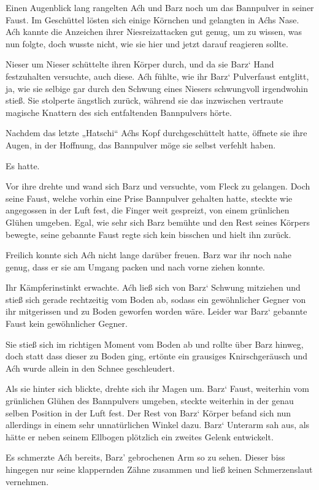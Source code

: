 Einen Augenblick lang rangelten Aćh und Barz noch um das Bannpulver in seiner Faust. Im Geschüttel lösten sich einige Körnchen und gelangten in Aćhs Nase. Aćh kannte die Anzeichen ihrer Niesreizattacken gut genug, um zu wissen, was nun folgte, doch wusste nicht, wie sie hier und jetzt darauf reagieren sollte.

Nieser um Nieser schüttelte ihren Körper durch, und da sie Barz‘ Hand festzuhalten versuchte, auch diese. Aćh fühlte, wie ihr Barz‘ Pulverfaust entglitt, ja, wie sie selbige gar durch den Schwung eines Niesers schwungvoll irgendwohin stieß. Sie stolperte ängstlich zurück, während sie das inzwischen vertraute magische Knattern des sich entfaltenden Bannpulvers hörte.

Nachdem das letzte „Hatschi“ Aćhs Kopf durchgeschüttelt hatte, öffnete sie ihre Augen, in der Hoffnung, das Bannpulver möge sie selbst verfehlt haben.

Es hatte.

Vor ihre drehte und wand sich Barz und versuchte, vom Fleck zu gelangen. Doch seine Faust, welche vorhin eine Prise Bannpulver gehalten hatte, steckte wie angegossen in der Luft fest, die Finger weit gespreizt, von einem grünlichen Glühen umgeben. Egal, wie sehr sich Barz bemühte und den Rest seines Körpers bewegte, seine gebannte Faust regte sich kein bisschen und hielt ihn zurück.

Freilich konnte sich Aćh nicht lange darüber freuen. Barz war ihr noch nahe genug, dass er sie am Umgang packen und nach vorne ziehen konnte.

Ihr Kämpferinstinkt erwachte. Aćh ließ sich von Barz‘ Schwung mitziehen und stieß sich gerade rechtzeitig vom Boden ab, sodass ein gewöhnlicher Gegner von ihr mitgerissen und zu Boden geworfen worden wäre. Leider war Barz‘ gebannte Faust kein gewöhnlicher Gegner.

Sie stieß sich im richtigen Moment vom Boden ab und rollte über Barz hinweg, doch statt dass dieser zu Boden ging, ertönte ein grausiges Knirschgeräusch und Aćh wurde allein in den Schnee geschleudert.

Als sie hinter sich blickte, drehte sich ihr Magen um. Barz‘ Faust, weiterhin vom grünlichen Glühen des Bannpulvers umgeben, steckte weiterhin in der genau selben Position in der Luft fest. Der Rest von Barz‘ Körper befand sich nun allerdings in einem sehr unnatürlichen Winkel dazu. Barz‘ Unterarm sah aus, als hätte er neben seinem Ellbogen plötzlich ein zweites Gelenk entwickelt.

Es schmerzte Aćh bereits, Barz’ gebrochenen Arm so zu sehen. Dieser biss hingegen nur seine klappernden Zähne zusammen und ließ keinen Schmerzenslaut vernehmen.

